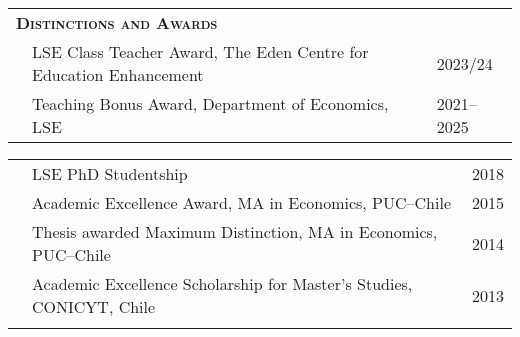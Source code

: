 \begin{tabular}{lll}
	
	\multicolumn{3}{l}{
		\large
		\textbf{%
			\textsc{%
				Distinctions and Awards
			}
		}
	}
	\\[2ex]
	
	  \indent

	& LSE Class Teacher Award, The Eden Centre for Education Enhancement
	& 2023/24
	\\[.5ex]
	
	& Teaching Bonus Award, Department of Economics, LSE
	& 2021--2025
	\\[.5ex]
	
	
	
\end{tabular}

\begin{tabular}{lll}

	  \indent
	& LSE PhD Studentship
	& 2018
	\\[.5ex]
	
	& Academic Excellence Award, MA in Economics, PUC--Chile
	& 2015
	\\[.5ex]
	
	& Thesis awarded Maximum Distinction, MA in Economics, PUC--Chile
	& 2014
	\\[.5ex]
	
	& Academic Excellence Scholarship for Master's Studies, CONICYT, Chile
	& 2013
	\\[-3ex]
	&\hphantom{LSE Class Teacher Award, The Eden Centre for Education Enhancement}
	
\end{tabular}
